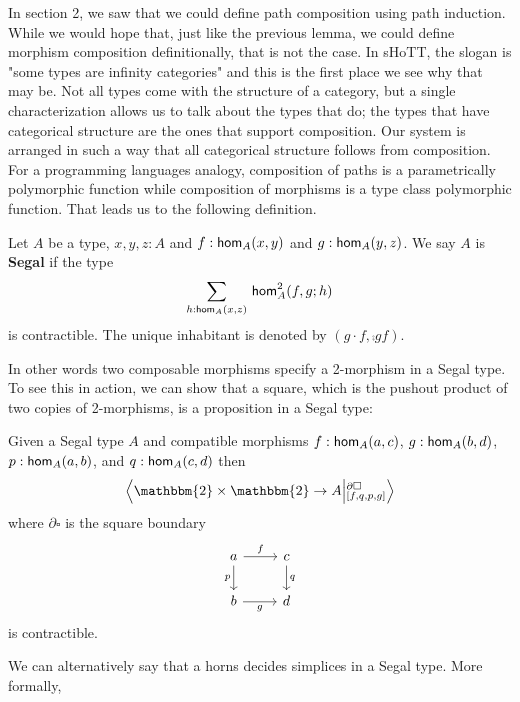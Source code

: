 \documentclass[main.tex]{subfiles}
\begin{document}
In section 2, we saw that we could define path composition using path induction. While we would hope that, just like the previous lemma,
we could define morphism composition definitionally, that is not the case. In sHoTT,
the slogan is "some types are infinity categories" and this is the first place we see why that may be. Not all types come with the
structure of a category, but a single characterization allows us to talk about the types that do; the types that have categorical structure
are the ones that support composition. Our system is arranged in such a way that all categorical structure follows from composition.
For a programming languages analogy, composition of paths is a parametrically polymorphic 
function while composition of morphisms is a type class polymorphic function. That leads us to the following definition.
\begin{definition}
    \label{def:def3.3}
    Let $A$ be a type, $x,y,z : A$ and $f : \ho[A]{x}{y}$ and $g : \ho[A]{y}{z}$. We say $A$ is \textbf{Segal} if the type $${\sm{h : \ho[A]{x}{z}} \hot[A]{f}{g}{h}} $$
    is contractible. The unique inhabitant is denoted by $(g\cdot f, \comp{g}{f}).$
\end{definition}

In other words two composable morphisms specify a 2-morphism in a Segal type. To see this in action, we can show that a square, which
is the pushout product of two copies of 2-morphisms, is a proposition in a Segal type:
\begin{lemma}
    Given a Segal type $A$ and compatible morphisms $f : \ho[A]{a}{c}$, \linebreak $g:\ho[A]{b}{d}$, $p:\ho[A]{a}{b}$, and $q : \ho[A]{c}{d}$ then
    \begin{equation}
        \ndexten{\mathbbm{2}\times\mathbbm{2}}{A}{\partial \square}{[f,q,p,g]}
    \end{equation}
    where $\partial\square$ is the square boundary
\[
  \begin{tikzcd} 
        a \arrow[r, "f"] \arrow[d, "p"']   
        & c \arrow[d, "q"] 
         \\ 
        b \arrow[r, "g"']  & d
    \end{tikzcd} 
\]
    is contractible.
\end{lemma}
We can alternatively say that a horns
decides simplices in a Segal type. More formally,
\end{document}
